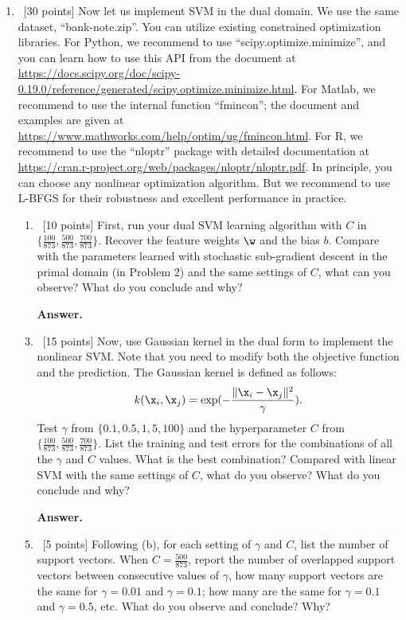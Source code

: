 \documentclass[12pt, fullpage,letterpaper]{article}
\begin{document}
\begin{enumerate}
\item~[30 points] Now let us implement SVM in the dual domain. We use the same dataset, ``bank-note.zip''. You can utilize existing constrained optimization libraries. For Python, we recommend to use ``scipy.optimize.minimize'', and you can learn how to use this API from the document at \url{https://docs.scipy.org/doc/scipy-0.19.0/reference/generated/scipy.optimize.minimize.html}.
For Matlab, we recommend to use the internal function ``fmincon''; the document and examples are given at \url{https://www.mathworks.com/help/optim/ug/fmincon.html}. For R, we recommend to use the ``nloptr'' package with detailed documentation at \url{https://cran.r-project.org/web/packages/nloptr/nloptr.pdf}. In principle, you can choose any nonlinear optimization algorithm. But we recommend to use L-BFGS for their robustness and excellent performance in practice. 

\begin{enumerate}
	\item ~[10 points] First, run your dual SVM learning algorithm with   $C$ in $\{\frac{100}{873}, \frac{500}{873}, \frac{700}{873}\}$. Recover the feature weights $\w$ and the bias $b$. Compare with the parameters learned with stochastic sub-gradient descent in the primal domain (in Problem 2) and the same settings of $C$, what can you observe? What do you conclude and why?
	
\item[{\bf Answer.}]

	\item~[15 points] Now, use Gaussian kernel in the dual form to implement the nonlinear SVM. Note that you need to modify both the objective function and the prediction. The Gaussian kernel is defined as follows:
	\[
	k(\x_i, \x_j) = \exp(-\frac{\|\x_i - \x_j\|^2}{\gamma}).
	\]
	Test $\gamma$ from $\{0.1, 0.5, 1,  5, 100\}$ and the hyperparameter $C$ from $\{ \frac{100}{873}, \frac{500}{873},  \frac{700}{873}\}$. List the training and test errors for the combinations of all the $\gamma$ and $C$ values. What is the best combination? Compared with linear SVM with the same settings of $C$, what do you observe? What do you conclude and why?  
	
\item[{\bf Answer.}]

	\item~[5 points] Following (b), for each setting of $\gamma$ and $C$, list the number of support vectors. When $C = \frac{500}{873}$, report the number of overlapped support vectors between consecutive values of $\gamma$, \ie how many support vectors are the same for $\gamma= 0.01$ and $\gamma = 0.1$; how many are the same for  $\gamma = 0.1$ and $\gamma = 0.5$, etc. What do you observe and conclude? Why?
	

\end{enumerate}
\end{enumerate}
\end{document}
